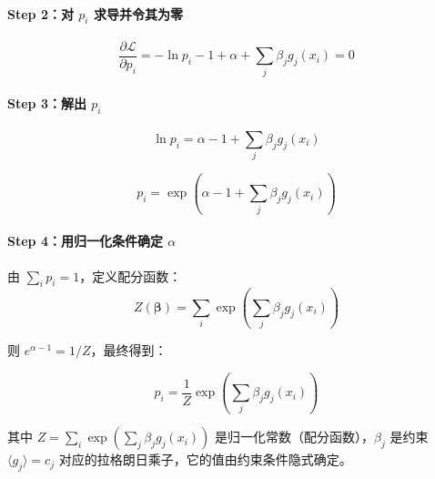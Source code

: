 \paragraph{Step 2：对 $p_i$ 求导并令其为零}
\begin{equation}
\frac{\partial \mathcal{L}}{\partial p_i} = -\ln p_i - 1 + \alpha + \sum_j \beta_j g_j(x_i) = 0
\end{equation}

\paragraph{Step 3：解出 $p_i$}
\begin{equation}
\ln p_i = \alpha - 1 + \sum_j \beta_j g_j(x_i)
\end{equation}

\begin{equation}
p_i = \exp\left( \alpha - 1 + \sum_j \beta_j g_j(x_i) \right)
\end{equation}

\paragraph{Step 4：用归一化条件确定 $\alpha$}

由 $\sum_i p_i = 1$，定义配分函数：
\begin{equation}
Z(\bm{\beta}) = \sum_i \exp\left( \sum_j \beta_j g_j(x_i) \right)
\end{equation}

则 $e^{\alpha - 1} = 1/Z$，最终得到：

\begin{keytheorem}[title=最大熵分布的指数形式]
\begin{equation}
\boxed{p_i = \frac{1}{Z} \exp\left( \sum_j \beta_j g_j(x_i) \right)}
\label{eq:maxent}
\end{equation}

其中 $Z = \sum_i \exp\left( \sum_j \beta_j g_j(x_i) \right)$ 是归一化常数（配分函数），$\beta_j$ 是约束 $\langle g_j \rangle = c_j$ 对应的拉格朗日乘子，它的值由约束条件隐式确定。
\end{keytheorem}

